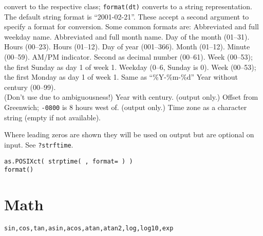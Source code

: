 	{convert to the respective class; {\tt format(dt)} converts to a string representation. The default string format is ``2001-02-21''. These accept a second argument to specify a format for conversion. Some common formats are:}
	{Abbreviated and full \\weekday name.}
	{Abbreviated and full month name.}
	{Day of the month (01--31).}
	{Hours (00--23).}
	{Hours (01--12).}
	{Day of year (001--366).}
	{Month (01--12).}
	{Minute (00--59).}
	{AM/PM indicator. }
	{Second as decimal number (00--61).}
	{Week (00--53); the first Sunday as day 1 of week 1.}
	{Weekday (0--6, Sunday is 0).}
	{Week (00--53); the first Monday as day 1 of week 1.}
	{Same as ``\%Y-\%m-\%d''}
	{Year without century (00--99).\\(Don't use due to ambiguousness!)}
	{Year with century.}
	{(output only.) Offset from Greenwich; {\tt -0800} is 8 hours west of.}
	{(output only.) Time zone as a character
    string (empty if not available).}

Where leading zeros are shown they will be used on output but are
optional on input. See {\tt ?strftime}.

{\tt as.POSIXct( strptime( , format= ) )\\
    format()}

\section{Math}{{\tt sin,cos,tan,asin,acos,atan,atan2,log,log10,exp}}

